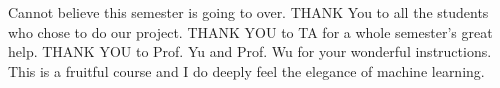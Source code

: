 \documentclass{sig-alternate}
\begin{document}
Cannot believe this semester is going to over. THANK You to all the students who chose to do our project. THANK YOU to TA for a whole semester's great help. THANK YOU to Prof. Yu and Prof. Wu for your wonderful instructions. This is a fruitful course and I do deeply feel the elegance of machine learning.

%

%
%
\end{document}
